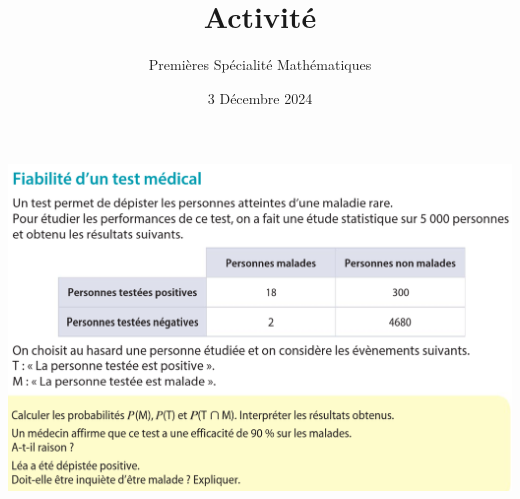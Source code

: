 \documentclass{article}
\title{Activité}
\author{Premières Spécialité Mathématiques}
\date{3 Décembre 2024}
\begin{document}
\begin{center}
\includegraphics[width=\textwidth]{Activite.png}
\end{center}
\end{document}
